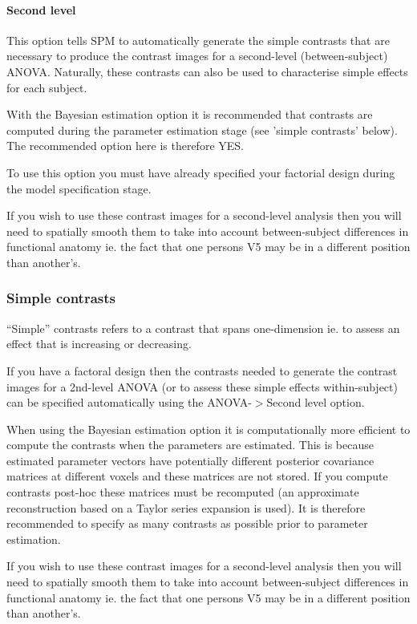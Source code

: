 \paragraph{Second level}

This option tells SPM to automatically generate the simple contrasts that are necessary to produce the contrast images for a second-level (between-subject) ANOVA. Naturally, these contrasts can also be used to characterise simple effects for each subject.

With the Bayesian estimation option it is recommended that contrasts are computed during the parameter estimation stage (see 'simple contrasts' below). The recommended option here is therefore YES.

To use this option you must have already specified your factorial design during the model specification stage. 

If you wish to use these contrast images for a second-level analysis then you will need to spatially smooth them to take into account between-subject differences in functional anatomy ie. the fact that one persons V5 may be in a different position than another's.

\subsubsection{Simple contrasts}

``Simple'' contrasts refers to a contrast that spans one-dimension ie. to assess an effect that is increasing or decreasing.

If you have a factoral design then the contrasts needed to generate the contrast images for a 2nd-level ANOVA (or to assess these simple effects within-subject) can be specified automatically using the ANOVA-$>$Second level option.

When using the Bayesian estimation option it is computationally more efficient to compute the contrasts when the parameters are estimated. This is because estimated parameter vectors have potentially different posterior covariance matrices at different voxels and these matrices are not stored. If you compute contrasts post-hoc these matrices must be recomputed (an approximate reconstruction based on a Taylor series expansion is used). It is therefore recommended to specify as many contrasts as possible prior to parameter estimation.

If you wish to use these contrast images for a second-level analysis then you will need to spatially smooth them to take into account between-subject differences in functional anatomy ie. the fact that one persons V5 may be in a different position than another's.

